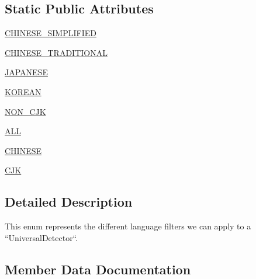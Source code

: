 \subsection*{Static Public Attributes}
\begin{DoxyCompactItemize}
\item 
\hyperlink{classpip_1_1__vendor_1_1chardet_1_1enums_1_1LanguageFilter_a7339141235313af422b13274a706d76d}{C\+H\+I\+N\+E\+S\+E\+\_\+\+S\+I\+M\+P\+L\+I\+F\+I\+ED}
\item 
\hyperlink{classpip_1_1__vendor_1_1chardet_1_1enums_1_1LanguageFilter_a273f91d37962a83da325746add8d8cf6}{C\+H\+I\+N\+E\+S\+E\+\_\+\+T\+R\+A\+D\+I\+T\+I\+O\+N\+AL}
\item 
\hyperlink{classpip_1_1__vendor_1_1chardet_1_1enums_1_1LanguageFilter_ac1803849978b46d086dc046a96d37fb9}{J\+A\+P\+A\+N\+E\+SE}
\item 
\hyperlink{classpip_1_1__vendor_1_1chardet_1_1enums_1_1LanguageFilter_a919a6e7764c2972dc95d1e4184e44ff3}{K\+O\+R\+E\+AN}
\item 
\hyperlink{classpip_1_1__vendor_1_1chardet_1_1enums_1_1LanguageFilter_a9de336ab2ff9bca621a5e18e8b80f7ea}{N\+O\+N\+\_\+\+C\+JK}
\item 
\hyperlink{classpip_1_1__vendor_1_1chardet_1_1enums_1_1LanguageFilter_aafe107d906ac9495afe1f2997a4797fe}{A\+LL}
\item 
\hyperlink{classpip_1_1__vendor_1_1chardet_1_1enums_1_1LanguageFilter_a3e8c6474bf3fd1313ad117f8a77edd7e}{C\+H\+I\+N\+E\+SE}
\item 
\hyperlink{classpip_1_1__vendor_1_1chardet_1_1enums_1_1LanguageFilter_a748d24d8f13391d54b0efbaf8750eb4a}{C\+JK}
\end{DoxyCompactItemize}


\subsection{Detailed Description}
\begin{DoxyVerb}This enum represents the different language filters we can apply to a
``UniversalDetector``.
\end{DoxyVerb}
 

\subsection{Member Data Documentation}
\mbox{\label{classpip_1_1__vendor_1_1chardet_1_1enums_1_1LanguageFilter_aafe107d906ac9495afe1f2997a4797fe}} 
